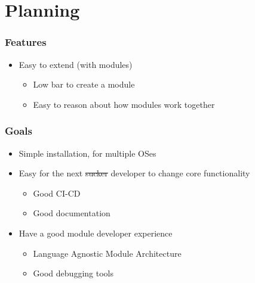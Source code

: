 \section{Planning}
\SectionPage

\begin{frame}
  \frametitle{Features}
  \begin{itemize}
    \item Easy to extend (with modules)
      \pause
      \begin{itemize}
        \item Low bar to create a module
        \pause
        \item Easy to reason about how modules work together
        \pause
      \end{itemize}
  \end{itemize}
\end{frame}

\begin{frame}
  \frametitle{Goals}
  \begin{itemize}
    \item Simple installation, for multiple OSes
      \pause
    \item Easy for the next \sout{sucker} developer to change core functionality
      \pause
      \begin{itemize}
        \item Good CI-CD
        \pause
        \item Good documentation
        \pause
      \end{itemize}
    \item Have a good module developer experience
      \begin{itemize}
          \pause
        \item Language Agnostic Module Architecture
          \pause
        \item Good debugging tools
      \end{itemize}
  \end{itemize}
\end{frame}

